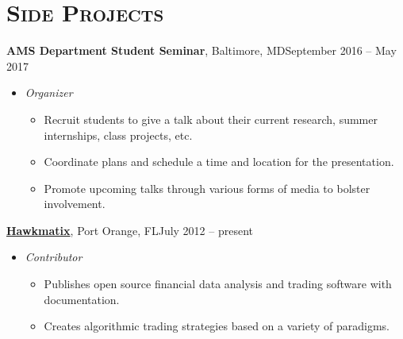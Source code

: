 \documentclass[10pt]{article}
\begin{document}
\section*{\textsc{Side Projects}}
\textbf{AMS Department Student Seminar}, Baltimore, MD\hfill September 2016 -- May 2017
\begin{itemize}[noitemsep]
    \item[] \textit{Organizer}
    \begin{itemize}[noitemsep]
        \item Recruit students to give a talk about their current research, summer internships, class projects, etc.
        \item Coordinate plans and schedule a time and location for the presentation.
        \item Promote upcoming talks through various forms of media to bolster involvement.
    \end{itemize}
\end{itemize}
\textbf{\href{www.hawkmatix.com}{Hawkmatix}}, Port Orange, FL\hfill July 2012 -- present
\begin{itemize}[noitemsep]
    \item[] \textit{Contributor}
    \begin{itemize}[noitemsep]
        \item Publishes open source financial data analysis and trading software with documentation.
        \item Creates algorithmic trading strategies based on a variety of paradigms.
    \end{itemize}
\end{itemize}
\end{document}
